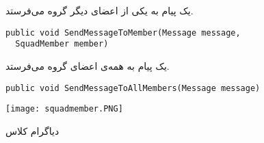 \begin{description}
  \item[]
  یک پیام به یکی از اعضای دیگر گروه می‌فرستد.
\begin{latin}
{\linespread{1.2}
{\inconsolata
\lstset{language=Java}
\begin{lstlisting}
public void SendMessageToMember(Message message,
  SquadMember member)
\end{lstlisting}
}
}
\end{latin}

  \item[]
  یک پیام به همه‌ی اعضای گروه می‌فرستد.
\begin{latin}
{\linespread{1.2}
{\inconsolata
\lstset{language=Java}
\begin{lstlisting}
public void SendMessageToAllMembers(Message message)
\end{lstlisting}
}
}
\end{latin}
    
\end{description}
\newpage
\begin{figure}
  \begin{center}
    \texttt{[image: squadmember.PNG]}
    \caption{دیاگرام کلاس 
    \label{fig4-1}}
  \end{center}
\end{figure}

